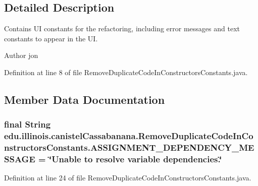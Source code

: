 \subsection{Detailed Description}
Contains UI constants for the refactoring, including error messages and text constants to appear in the UI.

\begin{DoxyAuthor}{Author}
jon 
\end{DoxyAuthor}


Definition at line 8 of file RemoveDuplicateCodeInConstructorsConstants.java.



\subsection{Member Data Documentation}
\hypertarget{classedu_1_1illinois_1_1canistelCassabanana_1_1RemoveDuplicateCodeInConstructorsConstants_af88d743c439c0f350deee3b7a8589bdc}{
\subsubsection[{ASSIGNMENT\_\-DEPENDENCY\_\-MESSAGE}]{\setlength{\rightskip}{0pt plus 5cm}final String {\bf edu.illinois.canistelCassabanana.RemoveDuplicateCodeInConstructorsConstants.ASSIGNMENT\_\-DEPENDENCY\_\-MESSAGE} = \char`\"{}Unable to resolve variable dependencies.\char`\"{}}}
\label{classedu_1_1illinois_1_1canistelCassabanana_1_1RemoveDuplicateCodeInConstructorsConstants_af88d743c439c0f350deee3b7a8589bdc}


Definition at line 24 of file RemoveDuplicateCodeInConstructorsConstants.java.

